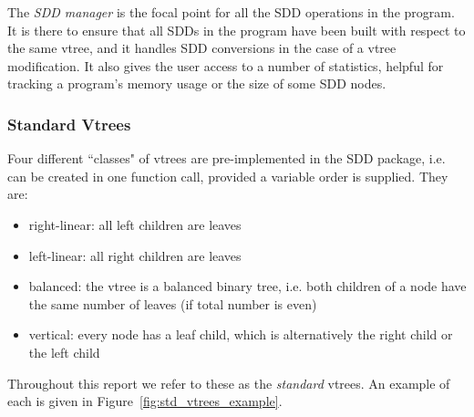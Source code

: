 \documentclass[11pt]{article}
\begin{document}
The \textit{SDD manager} is the focal point for all the SDD operations in the program. It is there to ensure that all SDDs in the program have been built with respect to the same vtree, and it handles SDD conversions in the case of a vtree modification. It also gives the user access to a number of statistics, helpful for tracking a program's memory usage or the size of some SDD nodes. 

\subsubsection{Standard Vtrees}
\label{std_vtrees}

Four different ``classes" of vtrees are pre-implemented in the SDD package, i.e. can be created in one function call, provided a variable order is supplied. 
They are:
\begin{itemize}
\item right-linear: all left children are leaves
\item left-linear: all right children are leaves
\item balanced: the vtree is a balanced binary tree, i.e. both children of a node have the same number of leaves (if total number is even)
\item vertical: every node has a leaf child, which is alternatively the right child or the left child
\end{itemize}
Throughout this report we refer to these as the \textit{standard} vtrees. An example of each is given in Figure~\ref{fig:std_vtrees_example}.
\end{document}
